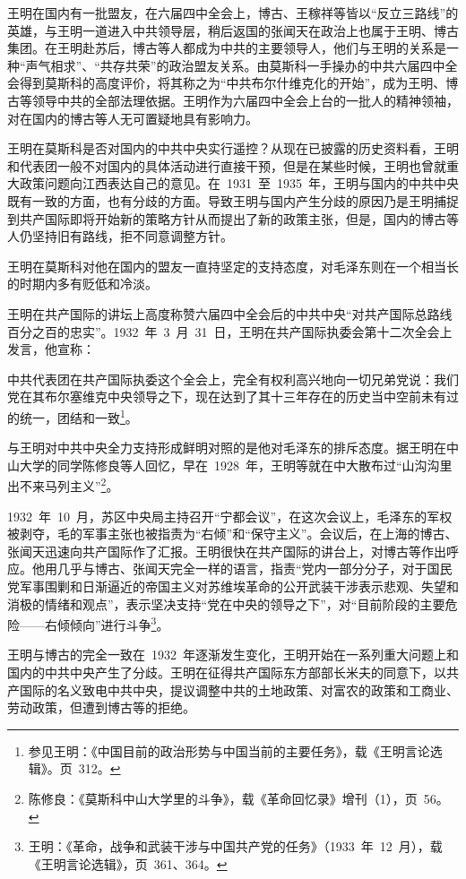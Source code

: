 王明在国内有一批盟友，在六届四中全会上，博古、王稼祥等皆以“反立三路线”的英雄，与王明一道进入中共领导层，稍后返国的张闻天在政治上也属于王明、博古集团。在王明赴苏后，博古等人都成为中共的主要领导人，他们与王明的关系是一种“声气相求”、“共存共荣”的政治盟友关系。由莫斯科一手操办的中共六届四中全会得到莫斯科的高度评价，将其称之为“中共布尔什维克化的开始”，成为王明、博古等领导中共的全部法理依据。王明作为六届四中全会上台的一批人的精神领袖，对在国内的博古等人无可置疑地具有影响力。

王明在莫斯科是否对国内的中共中央实行遥控？从现在已披露的历史资料看，王明和代表团一般不对国内的具体活动进行直接干预，但是在某些时候，王明也曾就重大政策问题向江西表达自己的意见。在~1931~至~1935~年，王明与国内的中共中央既有一致的方面，也有分歧的方面。导致王明与国内产生分歧的原因乃是王明捕捉到共产国际即将开始新的策略方针从而提出了新的政策主张，但是，国内的博古等人仍坚持旧有路线，拒不同意调整方针。

王明在莫斯科对他在国内的盟友一直持坚定的支持态度，对毛泽东则在一个相当长的时期内多有贬低和冷淡。

王明在共产国际的讲坛上高度称赞六届四中全会后的中共中央“对共产国际总路线百分之百的忠实”。1932~年~3~月~31~日，王明在共产国际执委会第十二次全会上发言，他宣称：

\begin{quoting}
中共代表团在共产国际执委这个全会上，完全有权利高兴地向一切兄弟党说：我们党在其布尔塞维克中央领导之下，现在达到了其十三年存在的历史当中空前未有过的统一，团结和一致\footnote{参见王明：《中国目前的政治形势与中国当前的主要任务》，载《王明言论选辑》。页~312。}。
\end{quoting}

与王明对中共中央全力支持形成鲜明对照的是他对毛泽东的排斥态度。据王明在中山大学的同学陈修良等人回忆，早在~1928~年，王明等就在中大散布过“山沟沟里出不来马列主义”\footnote{陈修良：《莫斯科中山大学里的斗争》，载《革命回忆录》增刊（1），页~56。}。

1932~年~10~月，苏区中央局主持召开“宁都会议”，在这次会议上，毛泽东的军权被剥夺，毛的军事主张也被指责为“右倾”和“保守主义”。会议后，在上海的博古、张闻天迅速向共产国际作了汇报。王明很快在共产国际的讲台上，对博古等作出呼应。他用几乎与博古、张闻天完全一样的语言，指责“党内一部分分子，对于国民党军事围剿和日渐逼近的帝国主义对苏维埃革命的公开武装干涉表示悲观、失望和消极的情绪和观点”，表示坚决支持“党在中央的领导之下”，对“目前阶段的主要危险——右倾倾向”进行斗争\footnote{王明：《革命，战争和武装干涉与中国共产党的任务》（1933~年~12~月），载《王明言论选辑》，页~361、364。}。

王明与博古的完全一致在~1932~年逐渐发生变化，王明开始在一系列重大问题上和国内的中共中央产生了分歧。王明在征得共产国际东方部部长米夫的同意下，以共产国际的名义致电中共中央，提议调整中共的土地政策、对富农的政策和工商业、劳动政策，但遭到博古等的拒绝。

